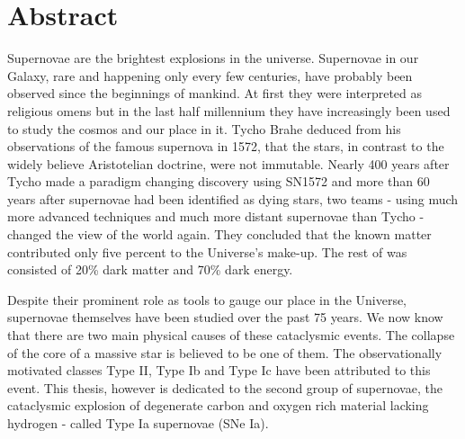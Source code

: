 \section*{Abstract}

Supernovae are the brightest explosions in the universe. Supernovae in our Galaxy, rare and happening only every few centuries, have probably been observed since the beginnings of mankind. At first they were interpreted as religious omens but in the last half millennium they have increasingly been used to study the cosmos and our place in it. Tycho Brahe deduced from his observations of the famous supernova in 1572, that the stars, in contrast to the widely believe Aristotelian doctrine, were not immutable. 
Nearly 400 years after Tycho made a paradigm changing discovery using SN1572 and more than 60 years after supernovae had been identified as dying stars, two teams - using much more advanced techniques and much more distant supernovae than Tycho - changed the view of the world again. They concluded  that the known matter contributed only five percent to the Universe's make-up. The rest of was consisted of 20\% dark matter and 70\% dark energy.

Despite their prominent role as tools to gauge our place in the Universe, supernovae themselves have been studied over the past 75 years. We now know that there are two main physical causes of these cataclysmic events. The collapse of the core of a massive star is believed to be one of them. The observationally motivated classes Type II, Type Ib and Type Ic have been attributed to this event. This thesis, however is dedicated to the second group of supernovae, the cataclysmic explosion of degenerate carbon and oxygen rich material lacking hydrogen - called Type Ia supernovae (SNe Ia). 

